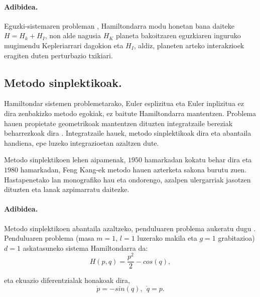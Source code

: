\paragraph*{Adibidea.} Eguzki-sistemaren probleman \cite{Saha1992,Wisdom2006}, Hamiltondarra modu honetan bana daiteke $H=H_k+H_I$, non alde nagusia $H_K$ planeta bakoitzaren eguzkiaren inguruko mugimendu Kepleriarrari dagokion eta $H_I$, aldiz, planeten arteko interakzioek eragiten duten perturbazio txikiari.   

\subsection{Metodo sinplektikoak.}

Hamiltondar sistemen problemetarako, Euler esplizitua eta Euler inplizitua ez dira zenbakizko metodo egokiak, ez baitute Hamiltondarra mantentzen. Problema hauen propietate geometrikoak mantentzen dituzten integratzaile bereziak beharrezkoak dira \cite{JMSanz-Serna1994,SSerna2015b}. Integratzaile hauek, metodo sinplektikoak dira eta abantaila handiena, epe luzeko integrazioetan azaltzen dute.

Metodo sinplektikoen lehen aipamenak, $1950$ hamarkadan kokatu behar dira eta $1980$ hamarkadan, Feng Kang-ek metodo hauen azterketa sakona burutu zuen. Hastapenetako lan monografiko hau \cite{JMSanz-Serna1994} eta ondorengo, azalpen ulergarriak jasotzen dituzten \cite{Hairer2006} eta  \cite{Leimkuhler2004} lanak azpimarratu daitezke.    


\paragraph*{Adibidea.} Metodo sinplektikoen abantaila azaltzeko, penduluaren problema aukeratu dugu \cite{Hairer2015a}. Penduluaren problema (masa $m=1$, $l=1$ luzerako makila eta $g=1$ grabitazioa) $d=1$ askatasuneko sistema Hamiltondarra da:
\begin{equation}
H(p,q)= \frac{p^2}{2}- cos (q),
\end{equation}

eta ekuazio diferentzialak honakoak dira,
\begin{equation}
\label{eq:pendulua}
\dot{p}= -sin (q), \ \ \dot{q}=p.
\end{equation}

